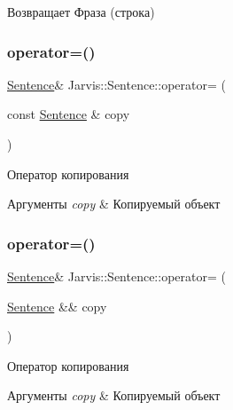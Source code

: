 \begin{DoxyReturn}{Возвращает}
Фраза (строка) 
\end{DoxyReturn}
\mbox{\label{classJarvis_1_1Sentence_a023e7f01ec0e27b0451206c1be002fda}} 
\subsubsection{\texorpdfstring{operator=()}{operator=()}\hspace{0.1cm}{\footnotesize\ttfamily [1/2]}}
{\footnotesize\ttfamily \hyperlink{classJarvis_1_1Sentence}{Sentence}\& Jarvis\+::\+Sentence\+::operator= (\begin{DoxyParamCaption}\item[{const \hyperlink{classJarvis_1_1Sentence}{Sentence} \&}]{copy }\end{DoxyParamCaption})}



Оператор копирования 


\begin{DoxyParams}{Аргументы}
{\em copy} & Копируемый объект \\
\hline
\end{DoxyParams}
\mbox{\label{classJarvis_1_1Sentence_a5f9db983639fc70219bf1a55033fe5ed}} 
\subsubsection{\texorpdfstring{operator=()}{operator=()}\hspace{0.1cm}{\footnotesize\ttfamily [2/2]}}
{\footnotesize\ttfamily \hyperlink{classJarvis_1_1Sentence}{Sentence}\& Jarvis\+::\+Sentence\+::operator= (\begin{DoxyParamCaption}\item[{\hyperlink{classJarvis_1_1Sentence}{Sentence} \&\&}]{copy }\end{DoxyParamCaption})}



Оператор копирования 


\begin{DoxyParams}{Аргументы}
{\em copy} & Копируемый объект \\
\hline
\end{DoxyParams}
\mbox{\label{classJarvis_1_1Sentence_a9663bb38ce80ea245bc8fb33e04fc41f}} 
